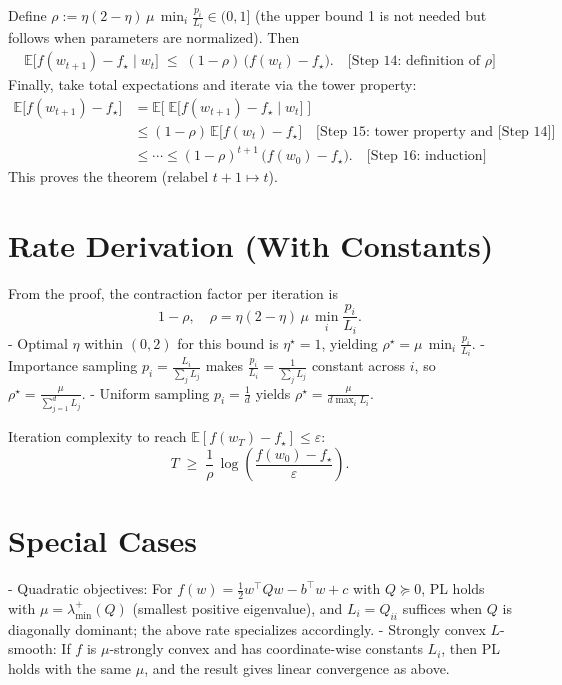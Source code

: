 \documentclass[11pt]{article}
\newcommand{\E}{\mathbb{E}}
\begin{document}
Define $\rho:=\eta(2-\eta)\,\mu\,\min_{i}\frac{p_i}{L_i}\in(0,1]$ (the upper bound 1 is not needed but follows when parameters are normalized). Then
\begin{align*}
\E\bigl[f(w_{t+1})-f_\star \mid w_t\bigr] \;\le\; (1-\rho)\,\bigl(f(w_t)-f_\star\bigr). \quad\text{[Step 14: definition of $\rho$]}
\end{align*}
Finally, take total expectations and iterate via the tower property:
\begin{align*}
\E\bigl[f(w_{t+1})-f_\star\bigr]
&= \E\bigl[\;\E\bigl[f(w_{t+1})-f_\star \mid w_t\bigr]\;\bigr] \\
&\le (1-\rho)\,\E\bigl[f(w_t)-f_\star\bigr] \quad\text{[Step 15: tower property and [Step 14]]} \\
&\le \cdots \le (1-\rho)^{t+1}\,\bigl(f(w_0)-f_\star\bigr). \quad\text{[Step 16: induction]}
\end{align*}
This proves the theorem (relabel $t+1\mapsto t$).

\section*{Rate Derivation (With Constants)}
From the proof, the contraction factor per iteration is
\[
1-\rho, \quad \rho=\eta(2-\eta)\,\mu\,\min_{i}\frac{p_i}{L_i}.
\]
- Optimal $\eta$ within $(0,2)$ for this bound is $\eta^\star=1$, yielding $\rho^\star=\mu\,\min_{i}\frac{p_i}{L_i}$.
- Importance sampling $p_i=\frac{L_i}{\sum_j L_j}$ makes $\frac{p_i}{L_i}=\frac{1}{\sum_j L_j}$ constant across $i$, so $\rho^\star=\frac{\mu}{\sum_{j=1}^d L_j}$.
- Uniform sampling $p_i=\frac{1}{d}$ yields $\rho^\star=\frac{\mu}{d\max_i L_i}$.

Iteration complexity to reach $\E[f(w_T)-f_\star]\le \varepsilon$:
\[
T \;\ge\; \frac{1}{\rho}\,\log\!\left(\frac{f(w_0)-f_\star}{\varepsilon}\right).
\]

\section*{Special Cases}
- Quadratic objectives: For $f(w)=\tfrac{1}{2}w^\top Q w - b^\top w + c$ with $Q\succeq 0$, PL holds with $\mu=\lambda_{\min}^+(Q)$ (smallest positive eigenvalue), and $L_i=Q_{ii}$ suffices when $Q$ is diagonally dominant; the above rate specializes accordingly.
- Strongly convex $L$-smooth: If $f$ is $\mu$-strongly convex and has coordinate-wise constants $L_i$, then PL holds with the same $\mu$, and the result gives linear convergence as above.
\end{document}
